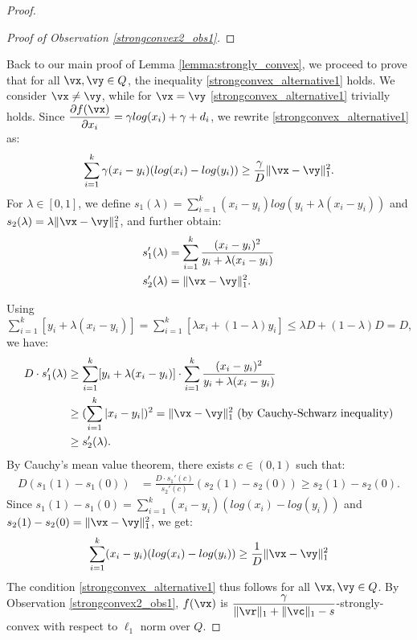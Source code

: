 \begin{proof}
\begin{proof}[Proof of Observation \ref{strongconvex2_obs1}]
    \end{proof}
Back to our main proof of Lemma \ref{lemma:strongly_convex}, we proceed to prove that for all $\vx,\vy \in Q$, the inequality \eqref{strongconvex_alternative1} holds. We consider $\vx \neq \vy$, while for $\vx = \vy$ \eqref{strongconvex_alternative1} trivially holds.
Since $\dfrac{\partial f(\vx)}{\partial x_i} = \gamma log(x_i) +\gamma + d_i$, we rewrite
\eqref{strongconvex_alternative1} as: 
\begin{align*}
    \sum_{i=1}^{k} \gamma (x_i-y_i) (log(x_i) - log(y_i)) \geq \frac{\gamma}{D} \|\vx-\vy \|_1^2.
\end{align*}
For $\lambda \in [0, 1]$, we define $s_1(\lambda) = \sum_{i=1}^{k} (x_i-y_i) log(y_i + \lambda (x_i - y_i)) $ and $s_2(\lambda) = \lambda \|\vx-\vy\|_1^2$, and further obtain:
\begin{align*}
    s_1'(\lambda) &= \sum_{i=1}^{k} \frac{(x_i-y_i)^2}{y_i + \lambda (x_i-y_i)} \\
    s_2'(\lambda) &= \|\vx-\vy\|_1^2.
\end{align*}

Using $\sum_{i=1}^{k} [y_i + \lambda (x_i-y_i)]= \sum_{i=1}^{k} [ \lambda x_i +(1-\lambda)y_i ] \leq \lambda D +(1-\lambda) D =D$, we have: 
\begin{align*}
    D \cdot s_1'(\lambda) &\geq \sum_{i=1}^{k} [ y_i + \lambda (x_i-y_i)] \cdot   \sum_{i=1}^{k} \frac{(x_i-y_i)^2}{y_i + \lambda (x_i-y_i)} \\
    &\geq (\sum_{i=1}^{k} |x_i-y_i|)^2 = \|\vx-\vy\|_1^2 \text{  (by Cauchy-Schwarz inequality)} \\
    &\geq s_2'(\lambda).
\end{align*}
By Cauchy's mean value theorem, there exists $c\in (0,1)$ such that: 
 \begin{align*}
 D(s_1(1) - s_1(0)) &= \frac{D\cdot s_1'(c)}{s_2'(c)} (s_2(1) - s_2(0)) \geq s_2(1) - s_2(0).
 \end{align*}
Since $s_1(1) - s_1(0)=\sum_{i=1}^{k} (x_i-y_i) (log(x_i) - log(y_i))$ and $s_2(1) - s_2(0)= \|\vx-\vy\|_1^2 $, we get:  
\begin{align*}
     \sum_{i=1}^{k} (x_i-y_i) (log(x_i) - log(y_i)) \geq \frac{1}{D} \|\vx-\vy\|_1^2
 \end{align*}
The condition \eqref{strongconvex_alternative1} thus follows for all $\vx,\vy \in Q$. By Observation \ref{strongconvex2_obs1}, $f(\vx)$ is $\dfrac{\gamma}{\| \vr \|_1 + \| \vc \|_1 - s}$-strongly-convex with respect to $\ell_1$ norm over $Q$.
\end{proof}

